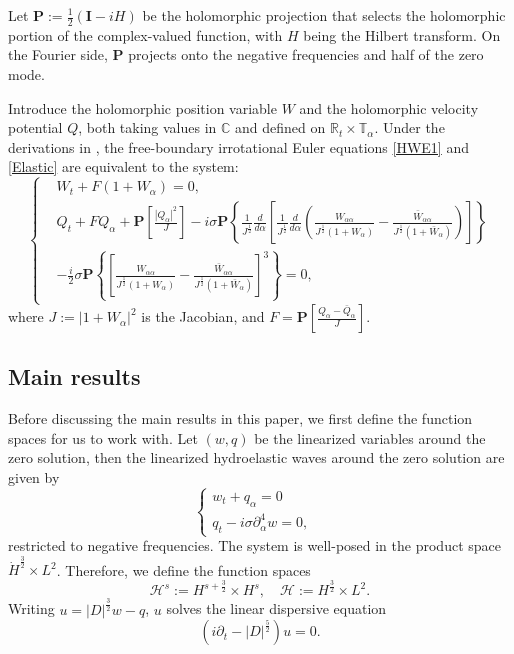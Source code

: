 \documentclass[12pt]{amsart}
\theoremstyle{remark}
\theoremstyle{definition}
\numberwithin{equation}{section}
\newcommand{\p}{\partial}
\newcommand{\al}{\alpha}
\newcommand{\f}{\frac}
\newcommand{\nP}{{\mathbf P}}
\begin{document}
Let $\mathbf{P}:= \frac{1}{2}(\mathbf{I} - iH)$ be the holomorphic projection that selects the holomorphic portion of the complex-valued function, with $H$ being the Hilbert transform.
On the Fourier side, $\nP$ projects onto the negative frequencies and half of the zero mode.

Introduce the holomorphic position variable $W$ and the holomorphic velocity potential $Q$, both taking values in $\mathbb{C}$ and defined on $\mathbb{R}_t \times \mathbb{T}_\alpha$. Under the derivations in \cite{MR4846707}, the free-boundary irrotational Euler equations \eqref{HWE1} and \eqref{Elastic} are equivalent to the system:
\begin{equation}\label{HF14}
	\begin{cases}
&W_t+F(1+W_{\al})=0,\\
&Q_t+FQ_{\al}+\nP\left[\f{|Q_{\al}|^2}{J}\right]
-i\sigma \nP\left\{\f{1}{J^{\f12}}\f{d}{d\al}\left[\f{1}{J^{\f12}}\f{d}{d\al}\left(\f{W_{\al\al}}{J^{\f12}(1+W_{\al})}
-\f{\bar{W}_{\al\al}}{J^{\f12}(1+\bar{W}_{\al})}\right)\right]\right\}\\
&-\f{i}{2}\sigma \nP\left\{\left[\f{W_{\al\al}}{J^{\f12}(1+W_{\al})}-\f{\bar{W}_{\al\al}}{J^{\f12}(1+\bar{W}_{\al})}\right]^3\right\}=0,
		\end{cases}
	\end{equation}
     where $J := |1+W_\alpha|^2$ is the Jacobian, and $F = \nP\left[\frac{Q_\alpha - \bar Q_\alpha}{J}\right]$.


\subsection{Main results}
Before discussing the main results in this paper, we first define the function spaces for us to work with. 
Let $(w, q)$ be the linearized variables around the zero solution, then the linearized hydroelastic waves around the zero solution are given by
\begin{equation} \label{ZeroLinear}
\left\{
\begin{array}{lr}
w_t + q_\alpha = 0 &  \\
q_t  - i\sigma\partial_\alpha^4 w =0,&  
             \end{array}
\right.
\end{equation}
restricted to negative frequencies.
The system is well-posed in the product space $\dot{H}^\f32 \times L^2$.
Therefore, we define the function spaces
\begin{equation*}
 \mathcal{H}^s :=H^{s+\f32}\times H^{s}, \quad \mathcal{H} :=H^{\f32}\times L^2.
\end{equation*}
Writing $u = |D|^{\f32}w - q$, $u$ solves the linear dispersive equation
\begin{equation*}
    (i\p_t - |D|^{\f52}) u = 0.
\end{equation*}
\end{document}
